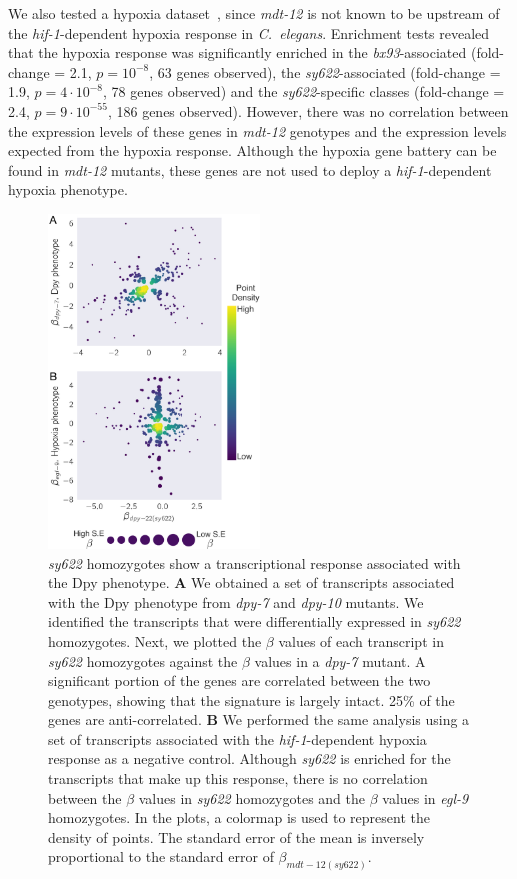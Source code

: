 \documentclass[10pt, twocolumn]{article}
\newcommand{\cel}{\emph{C.~elegans}}
\newcommand{\gene}[1]{\mbox{\emph{#1}}}
\newcommand{\dpy}{\gene{mdt-12}}
\begin{document}
We also tested a hypoxia dataset~\cite{AngelesAlboresHIF}, since \emph{mdt-12}
is not known to be upstream of the \gene{hif-1}-dependent hypoxia response
in \cel{}. Enrichment tests revealed that the hypoxia response was significantly
enriched in the \emph{bx93}-associated (fold-change = 2.1, $p=10^{-8}$, 63 genes
observed), the \emph{sy622}-associated (fold-change = 1.9, $p=4\cdot10^{-8}$, 78
genes observed) and the \emph{sy622}-specific classes (fold-change = 2.4,
$p=9\cdot10^{-55}$, 186 genes observed). However, there was no correlation
between the expression levels of these genes in \dpy{} genotypes and the
expression levels expected from the hypoxia response. Although the hypoxia gene
battery can be found in \dpy{} mutants, these genes are not used to deploy a
\gene{hif-1}-dependent hypoxia phenotype.

\begin{figure}
  \centering{}
  \includegraphics[width=0.5\textwidth]{../figs/dpy_phenotype.pdf}
  \caption{
    \emph{sy622} homozygotes show a transcriptional response associated with the
    Dpy phenotype. \textbf{A} We obtained a set of transcripts associated with
    the Dpy phenotype from \gene{dpy-7} and \gene{dpy-10} mutants. We identified
    the transcripts that were differentially expressed in \emph{sy622}
    homozygotes. Next, we plotted the $\beta$ values of each transcript in
    \emph{sy622} homozygotes against the $\beta$ values in a \emph{dpy-7}
    mutant. A significant portion of the genes are correlated between the two
    genotypes, showing that the signature is largely intact. 25\% of the genes
    are anti-correlated. \textbf{B} We performed the same analysis using a set
    of transcripts associated with the \gene{hif-1}-dependent hypoxia response
    as a negative control. Although \emph{sy622} is enriched for the transcripts
    that make up this response, there is no correlation between the $\beta$
    values in \emph{sy622} homozygotes and the  $\beta$ values in \emph{egl-9}
    homozygotes. In the plots, a colormap is used to represent the density of
    points. The standard error of the mean is inversely proportional to the
    standard error of $\beta_{mdt-12(sy622)}$.
    }
\label{fig:dpy_phenotype}
\end{figure}
\end{document}
